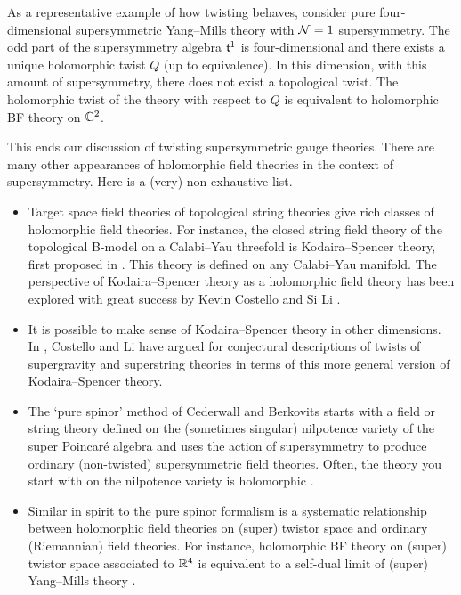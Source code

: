 \documentclass[11pt]{amsart}
\begin{document}
As a representative example of how twisting behaves, 
consider pure four-dimensional supersymmetric Yang--Mills theory with $\mathcal N=1$ supersymmetry.
The odd part of the supersymmetry algebra $\mathfrak t^1$ is four-dimensional and there exists a unique holomorphic twist $Q$ (up to equivalence).
In this dimension, with this amount of supersymmetry, there does not exist a topological twist.
The holomorphic twist of the theory with respect to $Q$ is equivalent to holomorphic BF theory on $\mathbb C^2$.

This ends our discussion of twisting supersymmetric gauge theories.
There are many other appearances of holomorphic field theories in the context of supersymmetry.
Here is a (very) non-exhaustive list.

\begin{itemize}
\item Target space field theories of topological string theories give rich classes of holomorphic field theories. 
For instance, the closed string field theory of the topological B-model on a Calabi--Yau threefold is Kodaira--Spencer theory, first proposed in \cite{BCOV}. 
This theory is defined on any Calabi--Yau manifold. 
The perspective of Kodaira--Spencer theory as a holomorphic field theory has been explored with great success by Kevin Costello and Si Li \cite{CL1, CL2, CL3}.
\item
It is possible to make sense of Kodaira--Spencer theory in other dimensions.
In \cite{CLsugra}, Costello and Li have argued for conjectural descriptions of twists of supergravity and superstring theories in terms of this more general version of Kodaira--Spencer theory.
\item The `pure spinor' method of Cederwall and Berkovits \cite{Cederwall, Berkovits} starts with a field or string theory defined on the (sometimes singular) nilpotence variety of the super Poincar\'e algebra and uses the action of supersymmetry to produce ordinary (non-twisted) supersymmetric field theories. 
Often, the theory you start with on the nilpotence variety is holomorphic \cite{ESW,SWpure}. 
\item Similar in spirit to the pure spinor formalism is a systematic relationship between holomorphic field theories on (super) twistor space and ordinary (Riemannian) field theories.
For instance, holomorphic BF theory on (super) twistor space associated to $\mathbb R^4$ is equivalent to a self-dual limit of (super) Yang--Mills theory \cite{Penrose, Kevins work..., other twistor literature}.
\end{itemize}
\end{document}

